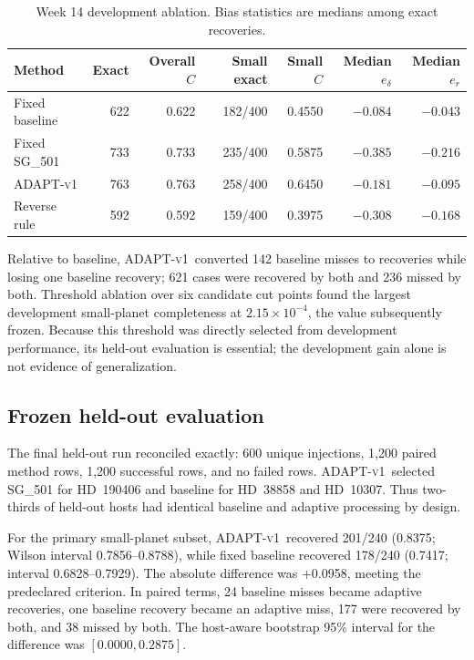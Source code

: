 \documentclass[11pt]{article}
\newcommand{\adapt}{\textsc{ADAPT-v1}}
\newcommand{\sg}[1]{\textsc{SG\_#1}}
\begin{document}
\begin{table}[htbp]
\centering
\caption{Week 14 development ablation. Bias statistics are medians among exact recoveries.}
\label{tab:w14}
\small
\begin{tabular}{lrrrrrr}
\toprule
Method & Exact & Overall $C$ & Small exact & Small $C$ & Median $e_\delta$ & Median $e_r$\\
\midrule
Fixed baseline & 622 & 0.622 & 182/400 & 0.4550 & $-0.084$ & $-0.043$\\
Fixed \sg{501} & 733 & 0.733 & 235/400 & 0.5875 & $-0.385$ & $-0.216$\\
\adapt & 763 & 0.763 & 258/400 & 0.6450 & $-0.181$ & $-0.095$\\
Reverse rule & 592 & 0.592 & 159/400 & 0.3975 & $-0.308$ & $-0.168$\\
\bottomrule
\end{tabular}
\end{table}

Relative to baseline, \adapt\ converted 142 baseline misses to recoveries while losing one baseline recovery; 621 cases were recovered by both and 236 missed by both. Threshold ablation over six candidate cut points found the largest development small-planet completeness at $2.15\times10^{-4}$, the value subsequently frozen. Because this threshold was directly selected from development performance, its held-out evaluation is essential; the development gain alone is not evidence of generalization.

\subsection{Frozen held-out evaluation}
The final held-out run reconciled exactly: 600 unique injections, 1,200 paired method rows, 1,200 successful rows, and no failed rows. \adapt\ selected \sg{501} for HD~190406 and baseline for HD~38858 and HD~10307. Thus two-thirds of held-out hosts had identical baseline and adaptive processing by design.

For the primary small-planet subset, \adapt\ recovered 201/240 (0.8375; Wilson interval 0.7856--0.8788), while fixed baseline recovered 178/240 (0.7417; interval 0.6828--0.7929). The absolute difference was +0.0958, meeting the predeclared criterion. In paired terms, 24 baseline misses became adaptive recoveries, one baseline recovery became an adaptive miss, 177 were recovered by both, and 38 missed by both. The host-aware bootstrap 95\% interval for the difference was $[0.0000,0.2875]$.
\end{document}
